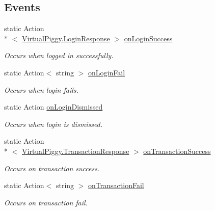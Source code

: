 \subsection*{Events}
\begin{DoxyCompactItemize}
\item 
static Action\\*
$<$ \hyperlink{class_virtual_piggy_1_1_login_response}{Virtual\-Piggy.\-Login\-Response} $>$ \hyperlink{class_virtual_piggy_event_listener_a37e2f432ebe9efec24f8d21c8e9433c7}{on\-Login\-Success}
\begin{DoxyCompactList}\small\item\em Occurs when logged in successfully. \end{DoxyCompactList}\item 
static Action$<$ string $>$ \hyperlink{class_virtual_piggy_event_listener_a580e126cb0048aaa4daafa0de836f4bb}{on\-Login\-Fail}
\begin{DoxyCompactList}\small\item\em Occurs when login fails. \end{DoxyCompactList}\item 
static Action \hyperlink{class_virtual_piggy_event_listener_ad0e8ac1d1b94df9f5dc1e3e7ec755ecc}{on\-Login\-Dismissed}
\begin{DoxyCompactList}\small\item\em Occurs when login is dismissed. \end{DoxyCompactList}\item 
static Action\\*
$<$ \hyperlink{class_virtual_piggy_1_1_transaction_response}{Virtual\-Piggy.\-Transaction\-Response} $>$ \hyperlink{class_virtual_piggy_event_listener_a58bcbdf1f33687818fd58a40bd07eeb3}{on\-Transaction\-Success}
\begin{DoxyCompactList}\small\item\em Occurs on transaction success. \end{DoxyCompactList}\item 
static Action$<$ string $>$ \hyperlink{class_virtual_piggy_event_listener_a2bb1383f9e7fff212815aa3c838180cf}{on\-Transaction\-Fail}
\begin{DoxyCompactList}\small\item\em Occurs on transaction fail. \end{DoxyCompactList}\end{DoxyCompactItemize}


